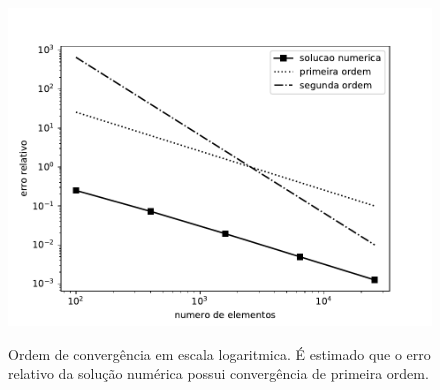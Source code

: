 \begin{figure}[H]
     \centering
     \includegraphics[scale=1]{./02_chaps/cap_validation/figure/poiseuille_error.pdf}\\
     \medskip
     \caption{Ordem de convergência em escala logaritmica. É estimado que o erro relativo
              da solução numérica possui convergência de primeira ordem.}
     \label{ordem de convergencia poiseuille}
\end{figure}


\newpage
